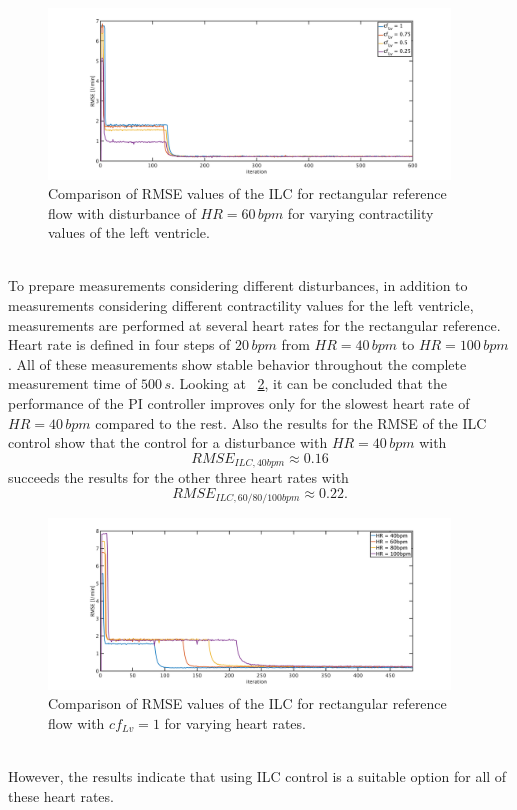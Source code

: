 \begin{figure}[ht!]
  \centering
  \includegraphics[width=0.95\textwidth]{images/chapt_5/ILC/RMSE_dist_square_60_var_cf.pdf}
  \caption[RMSE Comparison of ILC for a rectangular reference flow for varying left ventricular contractilities]{Comparison of RMSE values of the ILC for rectangular reference flow with disturbance of $HR=60\,bpm$ for varying contractility values of the left ventricle.}
  \label{fig:RMSE_dist_square_60_var_cf}
\end{figure}
\\To prepare measurements considering different disturbances, in addition to measurements considering different contractility values for the left ventricle, measurements are performed at several heart rates for the rectangular reference. Heart rate is defined in four steps of $20\,bpm$ from $HR=40\,bpm$ to $HR=100\,bpm$. All of these measurements show stable behavior throughout the complete measurement time of $500\,s$.
Looking at \figurename~\ref{fig:RMSE_dist_square_const_var_hr}, it can be concluded that the performance of the PI controller improves only for the slowest heart rate of $HR=40\,bpm$ compared to the rest. Also the results for the RMSE of the ILC control show that the control for a disturbance with $HR=40\,bpm$ with
\begin{equation}
  RMSE_{ILC,40bpm}\approx 0.16
\end{equation}
succeeds the results for the other three heart rates with
\begin{equation}
  RMSE_{ILC,60/80/100bpm}\approx 0.22.
\end{equation}
\begin{figure}[ht!]
  \centering
  \includegraphics[width=0.95\textwidth]{images/chapt_5/ILC/RMSE_dist_square_const_var_hr.pdf}
  \caption[RMSE Comparison of ILC at rectangular reference flow for varying heart rates]{Comparison of RMSE values of the ILC for rectangular reference flow with $cf_{Lv}=1$ for varying heart rates.}
  \label{fig:RMSE_dist_square_const_var_hr}
\end{figure}
\\However, the results indicate that using ILC control is a suitable option for all of these heart rates.
